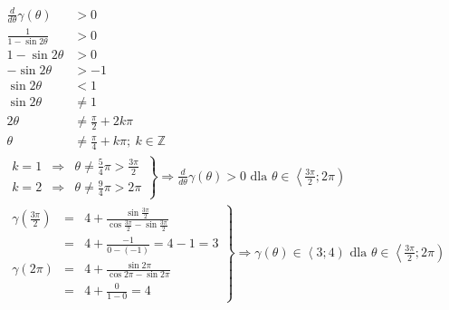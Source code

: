         \begin{align*}
        	\frac{d}{d\theta}\gamma\left( \theta\right)& > 0& \hspace{10cm}\\
        	\frac{
        		1
        	}{
        		1 - \sin 2\theta
        	} & > 0\\
        	1 - \sin 2\theta & > 0\\
        	 -\sin 2\theta & > -1\\
        	 \sin 2\theta & < 1\\
        	 \sin 2\theta & \neq 1\\
        	 2\theta & \neq \frac{\pi}{2} + 2k\pi\\
        	 \theta & \neq \frac{\pi}{4} + k\pi ; \ k \in \mathbb{Z}
        \end{align*}
       	\begin{align*}
       		\left. \begin{array}{rcl}
       		 k = 1 & \Rightarrow &\theta \neq \frac{5}{4}\pi > \frac{3\pi}{2}  \\
    	 	 k = 2 & \Rightarrow &\theta \neq \frac{9}{4}\pi > 2\pi
    	 	\end{array}    \right\}\Rightarrow \frac{d}{d\theta}\gamma\left( \theta\right) > 0 \text{ dla } \theta \in \left\langle \frac{3\pi}{2};2\pi\right)& \hspace{10cm}
        \end{align*}
       	\begin{align*}
       	\left. \begin{array}{rcl}
       		\gamma\left( \frac{3\pi}{2}\right) & = &
       		 4 + \frac{\sin \frac{3\pi}{2}}{\cos\frac{3\pi}{2} - \sin \frac{3\pi}{2}}\\
       		  & = & 4 + \frac{-1}{0 - \left(-1\right)}= 4 - 1 = 3\\
       		\gamma\left( 2\pi\right) & = &
       		4 + \frac{\sin  2\pi}{\cos  2\pi - \sin 2\pi} \\
       		& = &4 + \frac{0}{1 - 0} = 4
       	\end{array} \right\} \Rightarrow \gamma\left( \theta\right) \in \left\langle 3;4\right) \text{ dla } \theta \in\left\langle \frac{3\pi}{2};2\pi\right)& \hspace{10cm}
        \end{align*}